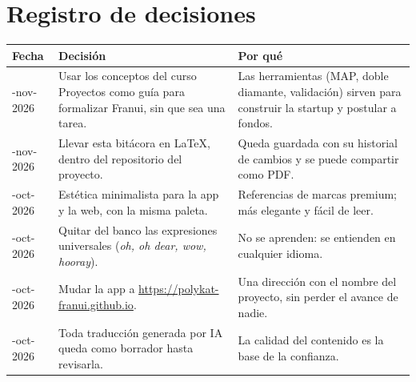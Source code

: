 \clearpage
\section{Registro de decisiones}

\begin{center}
\small
\begin{tabularx}{\linewidth}{>{\raggedright\arraybackslash}p{.15\linewidth}>{\raggedright\arraybackslash}X>{\raggedright\arraybackslash}X}
\toprule
\textbf{Fecha} & \textbf{Decisión} & \textbf{Por qué} \\
\midrule
10-nov-2026 & Usar los conceptos del curso Proyectos como guía para formalizar Franui, sin que sea una tarea. & Las herramientas (MAP, doble diamante, validación) sirven para construir la startup y postular a fondos. \\
10-nov-2026 & Llevar esta bitácora en LaTeX, dentro del repositorio del proyecto. & Queda guardada con su historial de cambios y se puede compartir como PDF. \\
31-oct-2026 & Estética minimalista para la app y la web, con la misma paleta. & Referencias de marcas premium; más elegante y fácil de leer. \\
31-oct-2026 & Quitar del banco las expresiones universales (\emph{oh, oh dear, wow, hooray}). & No se aprenden: se entienden en cualquier idioma. \\
14-oct-2026 & Mudar la app a \url{https://polykat-franui.github.io}. & Una dirección con el nombre del proyecto, sin perder el avance de nadie. \\
14-oct-2026 & Toda traducción generada por IA queda como borrador hasta revisarla. & La calidad del contenido es la base de la confianza. \\
\bottomrule
\end{tabularx}
\end{center}
